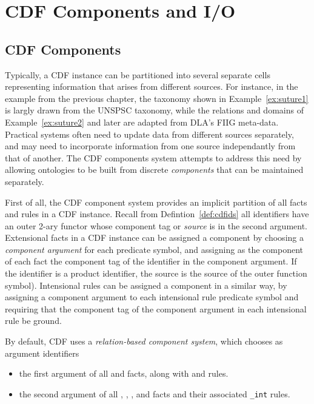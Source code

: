 \section{CDF Components and I/O} \label{sec:components}

\subsection{CDF Components}

Typically, a CDF instance can be partitioned into several separate
cells representing information that arises from different sources.
For instance, in the example from the previous chapter, the taxonomy
shown in Example~\ref{ex:suture1} is largly drawn from the UNSPSC
taxonomy, while the relations and domains of Example~\ref{ex:suture2}
and later are adapted from DLA's FIIG meta-data.  Practical systems
often need to update data from different sources separately, and may
need to incorporate information from one source independantly from
that of another.  The CDF components system attempts to address this
need by allowing ontologies to be built from discrete {\em components}
that can be maintained separately.

First of all, the CDF component system provides an implicit partition
of all facts and rules in a CDF instance.  Recall from
Defintion~\ref{def:cdfids} all identifiers have an outer 2-ary functor
whose component tag or {\em source} is in the second argument.
%
Extensional facts in a CDF instance can be assigned a component by
choosing a {\em component argument} for each predicate symbol, and
assigning as the component of each fact the component tag of the
identifier in the component argument.  If the identifier is a product
identifier, the source is the source of the outer function symbol).
Intensional rules can be assigned a component in a similar way, by
assigning a component argument to each intensional rule predicate
symbol and requiring that the component tag of the component argument
in each intensional rule be ground.

By default, CDF uses a {\em relation-based component system}, which
chooses as argument identifiers

\begin{itemize}
\item the first argument of all  and
 facts, along with  and
 rules.  

\item the second argument of all ,
, , 
and  facts and their associated {\tt \_int}
rules.
\end{itemize}

